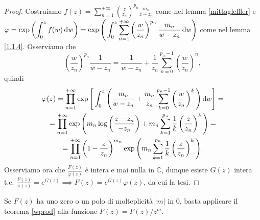 \begin{proof}
  Costruiamo $\displaystyle f(z)=\sum_{n=1}^{+\infty} \left(\frac{z}{z_n}\right)^{p_n}\frac{m_n}{z-z_n}$ come nel lemma \ref{mittagleffler} e $\displaystyle \varphi=\exp\left(\int_0^z f(w)\mathop{}\!\mathrm{d} w\right)=\exp\Bigg(\int_0^z \sum_{n=1}^{+\infty}\left(\frac{w}{z_n}\right)^{p_n}\frac{m_n}{w-z_n}\mathop{}\!\mathrm{d} w\Bigg)$ come nel lemma \ref{1.1.4}.
  Osserviamo che
  $$\left(\frac{w}{z_n}\right)^{p_n}\frac{1}{w-z_n}=\frac{1}{w-z_n}+\frac{1}{z_n}\sum_{k=0}^{p_n-1}\left(\frac{w}{z_n}\right)^n,$$
  quindi
  \begin{gather*}
    \varphi(z)=\prod_{n=1}^{+\infty} \exp\Bigg[\int_0^z\Bigg(\frac{m_n}{w-z_n}+\frac{m_n}{z_n}\sum_{k=0}^{p_n-1}\left(\frac{w}{z_n}\right)^k\Bigg)\mathop{}\!\mathrm{d} w\Bigg]= \\
    =\prod_{n=1}^{+\infty}\exp\Bigg(m_n\log\left(\frac{z-z_n}{-z_n}\right)+m_n\sum_{k=1}^{p_n}\frac{1}{k}\left(\frac{z}{z_n}\right)^k\Bigg)= \\
    =\prod_{n=1}^{+\infty} \left(1-\frac{z}{z_n}\right)^{m_n}\exp\Bigg(m_n\sum_{k=1}^{p_n}\frac{1}{k}\left(\frac{z}{z_n}\right)^k\Bigg).
  \end{gather*}
  Osserviamo ora che $\frac{F(z)}{\varphi(z)}$ è intera e mai nulla in $\mathbb{C}$, dunque esiste $G(z)$ intera t.c. $\frac{F(z)}{\varphi(z)}=e^{G(z)} \implies F(z)=e^{G(z)}\varphi(z)$, da cui la tesi.
\end{proof}

\begin{oss}
  Se $F(z)$ ha uno zero o un polo di molteplicità $|m|$ in $0$, basta applicare il teorema \ref{wprod} alla funzione $\tilde{F}(z)=F(z)/z^m$.
\end{oss}
